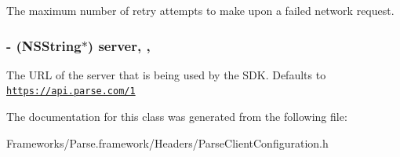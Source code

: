  





The maximum number of retry attempts to make upon a failed network request. \hypertarget{interface_parse_client_configuration_ab81c2f80805bd75fa3e75bedae4b92b6}{}
\subsubsection[{server}]{\setlength{\rightskip}{0pt plus 5cm}-\/ (N\+S\+String$\ast$) server\hspace{0.3cm}{\ttfamily [read]}, {\ttfamily [nonatomic]}, {\ttfamily [copy]}}\label{interface_parse_client_configuration_ab81c2f80805bd75fa3e75bedae4b92b6}
The U\+R\+L of the server that is being used by the S\+D\+K. Defaults to {\ttfamily \href{https://api.parse.com/1}{\tt https\+://api.\+parse.\+com/1}} 

The documentation for this class was generated from the following file\+:\begin{DoxyCompactItemize}
\item 
Frameworks/\+Parse.\+framework/\+Headers/Parse\+Client\+Configuration.\+h\end{DoxyCompactItemize}
